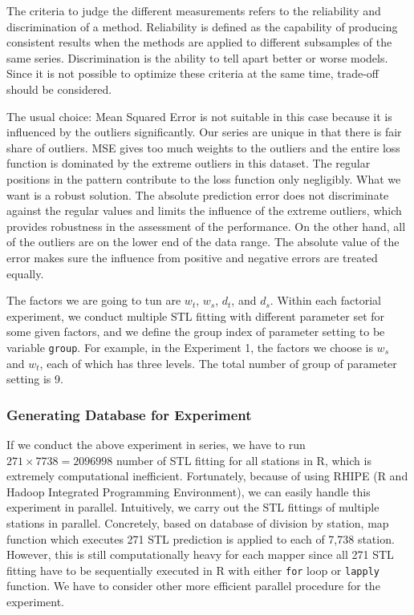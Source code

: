 The criteria to judge the different measurements refers to the reliability and
discrimination of a method. Reliability is defined as the capability of producing 
consistent results when the methods are applied to different subsamples of the 
same series. Discrimination is the ability to tell apart better or worse models. 
Since it is not possible to optimize these criteria at the same time, trade-off 
should be considered.

The usual choice: 
Mean Squared Error is not suitable in this case because it is influenced by the 
outliers significantly. Our series are unique in that there is fair share of 
outliers. MSE gives too much weights to the outliers and the entire loss function is
dominated by the extreme outliers in this dataset. The regular positions in the 
pattern contribute to the loss function only negligibly. What we want is a robust
solution. The absolute prediction error does not discriminate against the regular
values and limits the influence of the extreme outliers, which provides robustness 
in the assessment of the performance. On the other hand, all of the outliers are 
on the lower end of the data range. The absolute value of the error makes sure 
the influence from positive and negative errors are treated equally.

The factors we are going to tun are $w_t$, $w_s$, $d_t$, 
and $d_s$. Within each factorial experiment, we conduct multiple STL fitting with 
different parameter set for some given factors, and we define the group index of 
parameter setting to be variable \texttt{group}. For example, in the Experiment 1,
the factors we choose is $w_s$ and $w_t$, each of which has three levels. The 
total number of group of parameter setting is 9.

\subsubsection{Generating Database for Experiment}
\label{sec:a1950.stlexp}

If we conduct the above experiment in series, we have to run 
$271 \times 7738 = 2096998$ number of STL fitting for all stations in R, which is 
extremely computational inefficient. Fortunately, because of using RHIPE
(R and Hadoop Integrated Programming Environment), we can easily handle this 
experiment in parallel. Intuitively, we carry out the STL fittings of multiple 
stations in parallel. Concretely, based on database of division by station, map
function which executes 271 STL prediction is applied to each of 7,738 station.
However, this is still computationally heavy for each mapper since all 271 STL 
fitting have to be sequentially executed in R with either \texttt{for} loop or 
\texttt{lapply} function. We have to consider other more efficient parallel 
procedure for the experiment.

